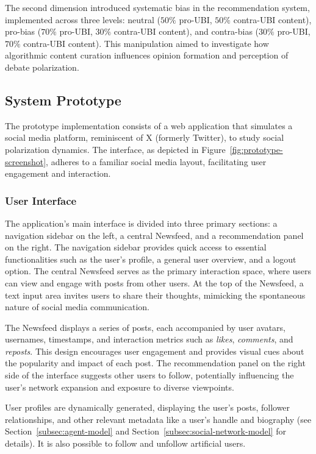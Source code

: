




The second dimension introduced systematic bias in the recommendation system, implemented across three levels: neutral ($50\%$ pro-UBI, $50\%$ contra-UBI content), pro-bias ($70\%$ pro-UBI, $30\%$ contra-UBI content), and contra-bias ($30\%$ pro-UBI, $70\%$ contra-UBI content). This manipulation aimed to investigate how algorithmic content curation influences opinion formation and perception of debate polarization.

\subsection{System Prototype}

The prototype implementation consists of a web application that simulates a social media platform, reminiscent of X (formerly Twitter), to study social polarization dynamics. The interface, as depicted in Figure~\ref{fig:prototype-screenshot}, adheres to a familiar social media layout, facilitating user engagement and interaction.

\subsubsection{User Interface}

The application's main interface is divided into three primary sections: a navigation sidebar on the left, a central Newsfeed, and a recommendation panel on the right. The navigation sidebar provides quick access to essential functionalities such as the user's profile, a general user overview, and a logout option. The central Newsfeed serves as the primary interaction space, where users can view and engage with posts from other users. At the top of the Newsfeed, a text input area invites users to share their thoughts, mimicking the spontaneous nature of social media communication.

The Newsfeed displays a series of posts, each accompanied by user avatars, usernames, timestamps, and interaction metrics such as \emph{likes}, \emph{comments}, and \emph{reposts}. This design encourages user engagement and provides visual cues about the popularity and impact of each post. The recommendation panel on the right side of the interface suggests other users to follow, potentially influencing the user's network expansion and exposure to diverse viewpoints.

User profiles are dynamically generated, displaying the user's posts, follower relationships, and other relevant metadata like a user's handle and biography (see Section~\ref{subsec:agent-model} and Section~\ref{subsec:social-network-model} for details). It is also possible to follow and unfollow artificial users.

